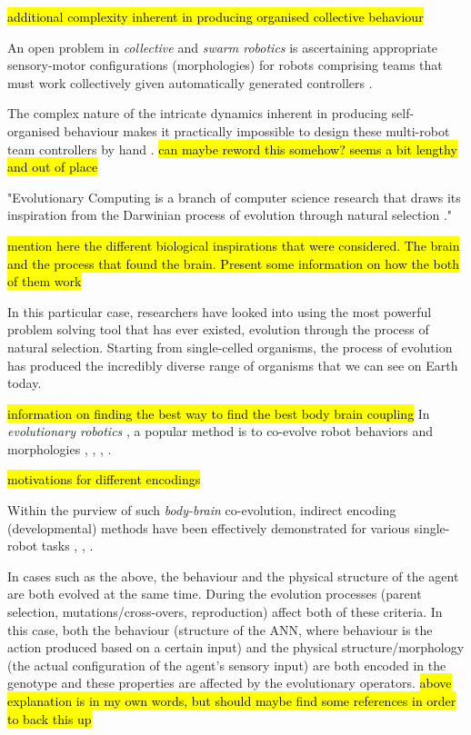 \hl{additional complexity inherent in producing organised collective behaviour}

An open problem in \textit{collective} \cite{KubeZhang1994B} and \textit{swarm robotics} \cite{Beni2004}
is ascertaining appropriate sensory-motor configurations (morphologies) for robots comprising teams that must work collectively given automatically generated controllers \cite{FloreanoDurrMattiussi2008}.

The complex nature of the intricate dynamics inherent in producing self-organised behaviour makes it practically impossible to design these multi-robot team controllers by hand \cite{RefWorks:11}. \hl{can maybe reword this somehow? seems a bit lengthy and out of place}

"Evolutionary Computing is a branch of computer science research  that draws its inspiration from the Darwinian process of evolution through natural selection \cite{EibenSmith2003}."

\hl{mention here the different biological inspirations that were considered. The brain and the process that found the brain. Present some information on how the both of them work}

In this particular case, researchers have looked into using the most powerful problem solving tool that has ever existed, evolution through the process of natural selection. Starting from single-celled organisms, the process of evolution has produced the incredibly diverse range of organisms that we can see on Earth today.

\hl{information on finding the best way to find the best body brain coupling}
In \textit{evolutionary robotics} \cite{DoncieuxBredecheMouretEiben2015},
a popular method is to co-evolve robot behaviors and morphologies
\cite{LipsonPollack2000}, \cite{Lund2003}, \cite{BuasonBergfeldtZiemke2005}, \cite{AuerbachBongard2014}.


\hl{motivations for different encodings}

Within the purview of such \textit{body-brain} co-evolution, indirect encoding (developmental) methods
have been effectively demonstrated for various single-robot tasks \cite{MautnerBelew2000},
\cite{HornbyPollack2002}, \cite{CheneyLipson2013}.

In cases such as the above, the behaviour and the physical structure of the agent are both evolved at the same time. During the evolution processes (parent selection, mutations/cross-overs, reproduction) affect both of these criteria. In this case, both the behaviour (structure of the ANN, where behaviour is the action produced based on a certain input) and the physical structure/morphology (the actual configuration of the agent's sensory input) are both encoded in the genotype and these properties are affected by the evolutionary operators.
\hl{above explanation is in my own words, but should maybe find some references in order to back this up}





